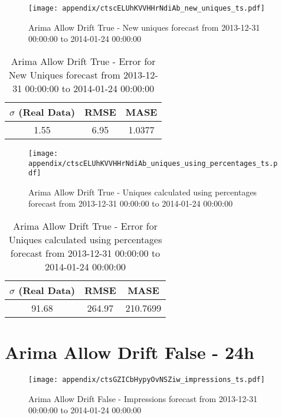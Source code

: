 \begin{figure}[H] \begin{center} \leavevmode
\texttt{[image: appendix/ctscELUhKVVHHrNdiAb\_new\_uniques\_ts.pdf]} \caption{
Arima Allow Drift True - New uniques forecast from 2013-12-31 00:00:00 to 2014-01-24 00:00:00} \label{fig:appendix/ctscELUhKVVHHrNdiAb_new_uniques_ts.pdf} \end{center}
\end{figure}

\begin{table}[H]
\centering
\footnotesize
\begin{tabular}{ccc}
$\sigma$ (Real Data) & RMSE & MASE   \\ \hline
1.55 & 6.95 & 1.0377 \\
\end{tabular}

\vspace{0.5cm}

\caption{
Arima Allow Drift True - Error for New Uniques forecast from 2013-12-31 00:00:00 to 2014-01-24 00:00:00}
\end{table}

\begin{figure}[H] \begin{center} \leavevmode
\texttt{[image: appendix/ctscELUhKVVHHrNdiAb\_uniques\_using\_percentages\_ts.pdf]} \caption{
Arima Allow Drift True - Uniques calculated using percentages forecast from 2013-12-31 00:00:00 to 2014-01-24 00:00:00} \label{fig:appendix/ctscELUhKVVHHrNdiAb_uniques_using_percentages_ts.pdf} \end{center}
\end{figure}

\begin{table}[H]
\centering
\footnotesize
\begin{tabular}{ccc}
$\sigma$ (Real Data) & RMSE & MASE   \\ \hline
91.68 & 264.97 & 210.7699 \\
\end{tabular}

\vspace{0.5cm}

\caption{
Arima Allow Drift True - Error for Uniques calculated using percentages forecast from 2013-12-31 00:00:00 to 2014-01-24 00:00:00}
\end{table}

\section{Arima Allow Drift False - 24h}
\begin{figure}[H] \begin{center} \leavevmode
\texttt{[image: appendix/ctsGZICbHypyOvNSZiw\_impressions\_ts.pdf]} \caption{
Arima Allow Drift False - Impressions forecast from 2013-12-31 00:00:00 to 2014-01-24 00:00:00} \label{fig:appendix/ctsGZICbHypyOvNSZiw_impressions_ts.pdf} \end{center}
\end{figure}

